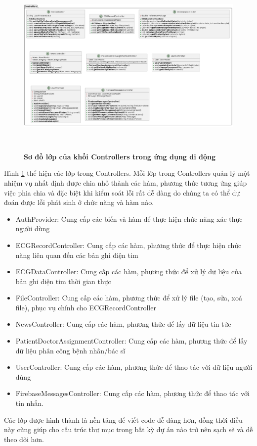 \begin{enumerate}[a)]
  \begin{figure}[H]
    \centering
    \includegraphics[width=16cm,height=9cm]{Images/mobile_app/class_diagram/mobile_class_controller.png}
    \caption[Sơ đồ lớp của khối Controllers trong ứng dụng di động]{\bfseries \fontsize{12pt}{0pt}\selectfont Sơ đồ lớp của khối Controllers trong ứng dụng di động}
    \label{mobile_class_controller} %
  \end{figure}

  Hình \ref{mobile_class_controller} thể hiện các lớp trong Controllers. Mỗi lớp trong Controllers quản lý một nhiệm vụ
  nhất định được chia nhỏ thành các hàm, phương thức tương ứng giúp việc phia chia và đặc biệt khi kiểm soát lỗi rất dễ dàng do
  chúng ta có thể dự đoán được lỗi phát sinh ở chức năng và hàm nào. 

  \begin{itemize}
    \item AuthProvider: Cung cấp các biến và hàm để thực hiện chức năng xác thực người dùng
    \item ECGRecordController: Cung cấp các hàm, phương thức để thực hiện chức năng liên quan đến các bản ghi điện tim
    \item ECGDataController: Cung cấp các hàm, phương thức để xử lý dữ liệu của bản ghi diện tim thời gian thực
    \item FileController: Cung cấp các hàm, phương thức để xử lý file (tạo, sửa, xoá file), phục vụ chính cho ECGRecordController  
    \item NewsController: Cung cấp các hàm, phương thức để lấy dữ liệu tin tức
    \item PatientDoctorAssignmentController: Cung cấp các hàm, phương thức để lấy dữ liệu phân công bệnh nhân/bác sĩ
    \item UserController: Cung cấp các hàm, phương thức để thao tác với dữ liệu người dùng 
    \item FirebaseMessagesController: Cung cấp các hàm, phương thức để thao tác với tin nhắn.
  \end{itemize}

  Các lớp được hình thành là nền tảng để viết code dễ dàng hơn, đồng thời điều này cũng giúp cho cấu trúc thư mục trong
  bất kỳ dự án nào trở nên sạch sẽ và dễ theo dõi hơn.
  
  \end{enumerate}

